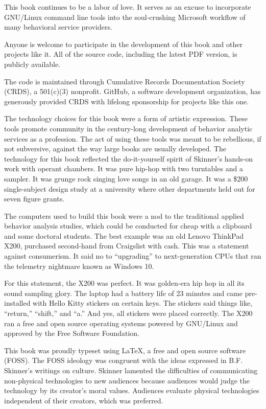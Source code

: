 This book continues to be a labor of love. It serves as an excuse to incorporate GNU/Linux command line tools into the soul-crushing Microsoft\textregistered{} workflow of many behavioral service providers. 

Anyone is welcome to participate in the development of this book and other projects like it. All of the source code, including the latest PDF version, is publicly available. 

The code is maintained through Cumulative Records Documentation Society (CRDS), a 501(c)(3) nonprofit. GitHub, a software development organization, has generously provided CRDS with lifelong sponsorship for projects like this one.

The technology choices for this book were a form of artistic expression. These tools promote community in the century-long development of behavior analytic services as a profession. The act of using these tools was meant to be rebellious, if not subversive, against the way large books are usually developed. The technology  for this book reflected the do-it-yourself spirit of Skinner's hands-on work with operant chambers. It was pure hip-hop with two turntables and a sampler. It was grunge rock singing love songs in an old garage. It was a \$200 single-subject design study at a university where other departments held out for seven figure grants.

The computers used to build this book were a nod to the traditional applied behavior analysis studies, which could be conducted for cheap with a clipboard and some doctoral students. The best example was an old Lenovo ThinkPad X200, purchased second-hand from Craigslist with cash. This was a statement against consumerism. It said no to ``upgrading'' to next-generation CPUs that ran the telemetry nightmare known as Windows 10.

For this statement, the X200 was perfect. It was golden-era hip hop in all its sound sampling glory. The laptop had a battery life of 23 minutes and came pre-installed with Hello Kitty stickers on certain keys. The stickers said things like, ``return,'' ``shift,'' and ``a.'' And yes, all stickers were placed correctly. The X200 ran a free and open source operating systems powered by GNU/Linux and approved by the Free Software Foundation.

This book was proudly typeset using \LaTeX{}, a free and open source software (FOSS). The FOSS ideology was congruent with the ideas expressed in B.F. Skinner's writings on culture. Skinner lamented the difficulties of communicating non-physical technologies to new audiences because audiences would judge the technology by its creator's moral values. Audiences evaluate physical technologies independent of their creators, which was preferred. 

